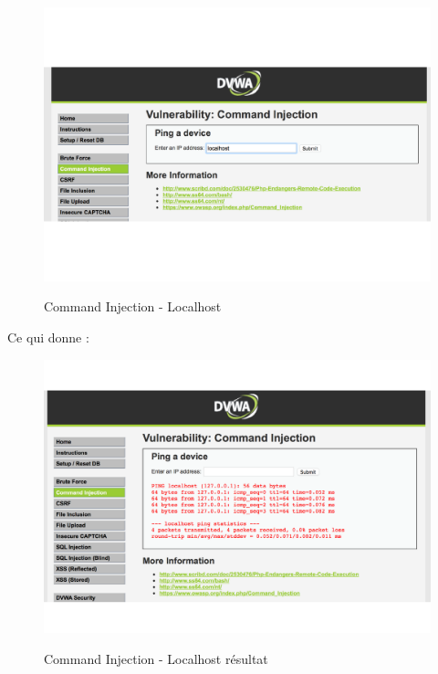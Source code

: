 \begin{figure}[!h]
\begin{center}

\label{inclusion}
\includegraphics[scale=0.5]{images/CommandInjection-Localhost.pdf}

\caption{Command Injection - Localhost}

\end{center}
\end{figure}

Ce qui donne :

\begin{figure}[!h]
\begin{center}

\label{inclusion}
\includegraphics[scale=0.5]{images/CommandInjection-LocalhostResultat.pdf}

\caption{Command Injection - Localhost résultat}

\end{center}
\end{figure}

